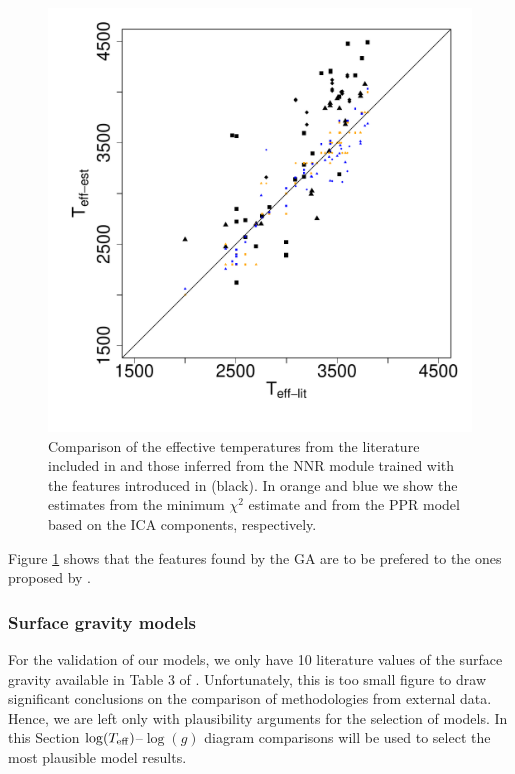 \begin {figure}
 \centering
  \includegraphics[scale=0.4]{figs/irtf-CESteffs-literature}
  
  \caption{Comparison of the effective temperatures from the
  literature included in \protect\cite{cesetti} and those inferred from the
  NNR module trained with the features introduced in \protect\cite{cesetti}
  (black). In orange and blue we show the estimates from the minimum
  $\chi^2$ estimate and from the PPR model based on the ICA
  components, respectively.}

\label{fig:irtf-cesteff}
\end {figure}

Figure \ref{fig:irtf-cesteff} shows that the features found by the GA
are to be prefered to the ones proposed by \cite{cesetti}. 

\subsubsection{Surface gravity models}

For the validation of our models, we only have 10 literature values of
the surface gravity available in Table 3 of
\cite{cesetti}. Unfortunately, this is too small figure to draw
significant conclusions on the comparison of methodologies from
external data. Hence, we are left only with plausibility arguments for
the selection of models. In this Section $\log(T_{\rm
eff})$--$\log(g)$ diagram comparisons will be used to select the most 
plausible model results. 

